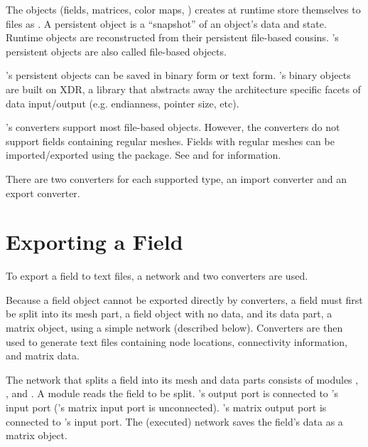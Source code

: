 The objects (fields, matrices, color maps, \etc) \sr{} creates at runtime
store themselves to files as .  A persistent
object is a ``snapshot'' of an object's data and state.  Runtime
objects are reconstructed from their persistent file-based cousins.
\sr{}'s persistent objects are also called \sr{} file-based objects.

\sr{}'s persistent objects can be saved in binary form or text form.
\sr{}'s binary objects are built on XDR, a library that abstracts
away the architecture specific facets of data input/output (e.g.
endianness, pointer size, etc).


\sr{}'s converters support most \sr{} file-based objects.  However,
the converters do not support fields containing regular meshes.
Fields with regular meshes can be imported/exported using the
 package.  See  and
for information.

There are two converters for each supported \sr{} type, an import
converter and an export converter.

\section{Exporting a Field}
\label{sec:export_field}

To export a \sr{} field to text files, a \sr{} network and two
converters are used.

Because a field object cannot be exported directly by converters, a
field must first be split into its mesh part, a field object with no
data, and its data part, a matrix object, using a simple \sr{} network
(described below).  Converters are then used to generate text files
containing node locations, connectivity information, and matrix data.

The \sr{} network that splits a field into its mesh and data parts
consists of modules ,
, and .  A
 module reads the field to be split.
's output port is connected to
's input port ('s
matrix input port is unconnected).  's
matrix output port is connected to 's input
port.  The (executed) network saves the field's data as a \sr{} matrix
object.

